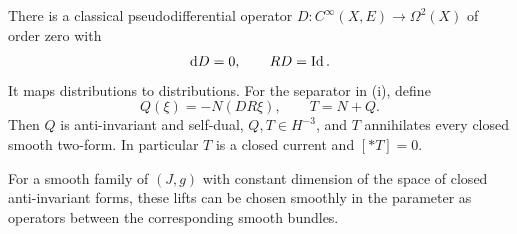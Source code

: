 \begin{lemma}\label{lem:closed-lift}
There is a classical pseudodifferential operator
$D:C^\infty(X,E)\longrightarrow\Omega^2(X)$ of order zero with
\begin{equation}\label{eq:current-lift-identities}
 \mathrm d D=0,\qquad RD=\operatorname{Id}.
\end{equation}
It maps distributions to distributions.  For the separator in
\textup{(i)}, define
\begin{equation}\label{eq:current-correction}
 Q(\xi)=-N(DR\xi),\qquad T=N+Q.
\end{equation}
Then $Q$ is anti-invariant and self-dual, $Q,T\in H^{-3}$, and $T$
annihilates every closed smooth two-form.  In particular $T$ is a closed
current and $[*T]=0$.

For a smooth family of $(J,g)$ with constant dimension of the space of
closed anti-invariant forms, these lifts can be chosen smoothly in the
parameter as operators between the corresponding smooth bundles.
\end{lemma}

